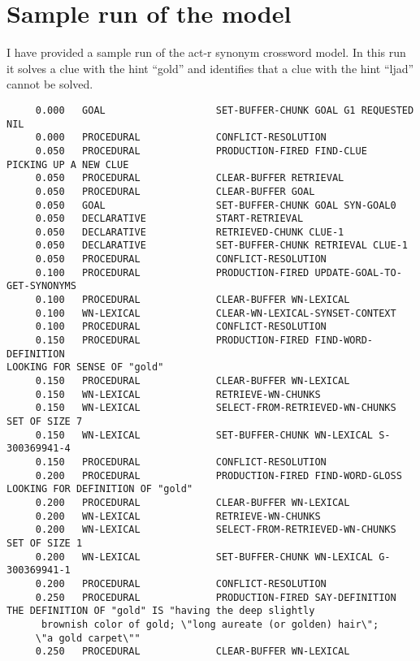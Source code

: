 \headsep 0.8in
\section{Sample run of the model}
I have provided a sample run of the act-r synonym crossword model. In this run it solves a clue with the hint ``gold'' and identifies that a clue with the hint ``ljad'' cannot be solved.

\begin{verbatim}
     0.000   GOAL                   SET-BUFFER-CHUNK GOAL G1 REQUESTED NIL 
     0.000   PROCEDURAL             CONFLICT-RESOLUTION 
     0.050   PROCEDURAL             PRODUCTION-FIRED FIND-CLUE 
PICKING UP A NEW CLUE 
     0.050   PROCEDURAL             CLEAR-BUFFER RETRIEVAL 
     0.050   PROCEDURAL             CLEAR-BUFFER GOAL 
     0.050   GOAL                   SET-BUFFER-CHUNK GOAL SYN-GOAL0 
     0.050   DECLARATIVE            START-RETRIEVAL 
     0.050   DECLARATIVE            RETRIEVED-CHUNK CLUE-1 
     0.050   DECLARATIVE            SET-BUFFER-CHUNK RETRIEVAL CLUE-1 
     0.050   PROCEDURAL             CONFLICT-RESOLUTION 
     0.100   PROCEDURAL             PRODUCTION-FIRED UPDATE-GOAL-TO-GET-SYNONYMS 
     0.100   PROCEDURAL             CLEAR-BUFFER WN-LEXICAL 
     0.100   WN-LEXICAL             CLEAR-WN-LEXICAL-SYNSET-CONTEXT 
     0.100   PROCEDURAL             CONFLICT-RESOLUTION 
     0.150   PROCEDURAL             PRODUCTION-FIRED FIND-WORD-DEFINITION 
LOOKING FOR SENSE OF "gold" 
     0.150   PROCEDURAL             CLEAR-BUFFER WN-LEXICAL 
     0.150   WN-LEXICAL             RETRIEVE-WN-CHUNKS 
     0.150   WN-LEXICAL             SELECT-FROM-RETRIEVED-WN-CHUNKS SET OF SIZE 7 
     0.150   WN-LEXICAL             SET-BUFFER-CHUNK WN-LEXICAL S-300369941-4 
     0.150   PROCEDURAL             CONFLICT-RESOLUTION 
     0.200   PROCEDURAL             PRODUCTION-FIRED FIND-WORD-GLOSS 
LOOKING FOR DEFINITION OF "gold" 
     0.200   PROCEDURAL             CLEAR-BUFFER WN-LEXICAL 
     0.200   WN-LEXICAL             RETRIEVE-WN-CHUNKS 
     0.200   WN-LEXICAL             SELECT-FROM-RETRIEVED-WN-CHUNKS SET OF SIZE 1 
     0.200   WN-LEXICAL             SET-BUFFER-CHUNK WN-LEXICAL G-300369941-1 
     0.200   PROCEDURAL             CONFLICT-RESOLUTION 
     0.250   PROCEDURAL             PRODUCTION-FIRED SAY-DEFINITION 
THE DEFINITION OF "gold" IS "having the deep slightly 
      brownish color of gold; \"long aureate (or golden) hair\";
     \"a gold carpet\"" 
     0.250   PROCEDURAL             CLEAR-BUFFER WN-LEXICAL 

\end{verbatim}
